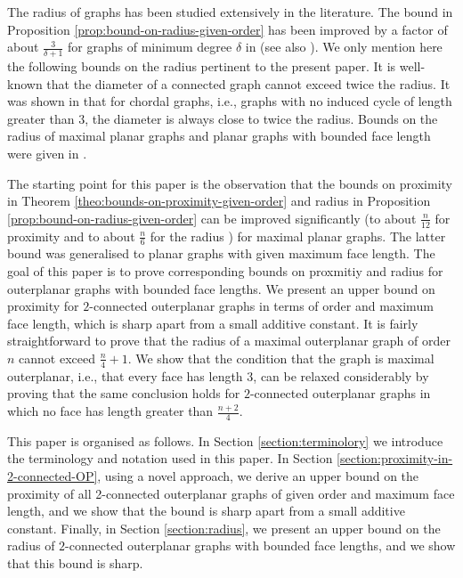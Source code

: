 \documentclass[a4paper,11pt]{article}
\numberwithin{equation}{theorem}
\begin{document}
The radius of graphs has been studied extensively in the literature. The bound in 
Proposition \ref{prop:bound-on-radius-given-order} has been improved by a factor of about
$\frac{3}{\delta+1}$ for graphs of minimum degree $\delta$ in \cite{ErdPacPolTuz1989} 
(see also \cite{KimRhoSonHwa2012, Muk2014}). We only mention here the following bounds on the radius
pertinent to the present paper. It is well-known that the diameter
of a connected graph cannot exceed twice the radius. It was shown in \cite{ChaNem1984} that for 
chordal graphs, i.e., graphs with no induced cycle of length greater than $3$, the diameter is
always close to twice the radius. Bounds on the radius of maximal planar graphs and planar 
graphs with bounded face length were given in \cite{AliDanMuk2012}.


The starting point for this paper is the observation that the bounds on proximity in 
Theorem \ref{theo:bounds-on-proximity-given-order} and radius in 
Proposition \ref{prop:bound-on-radius-given-order} can be improved significantly 
(to about $\frac{n}{12}$ for proximity \cite{CzaDanOlsSze2022} and to about 
$\frac{n}{6}$ for the radius  \cite{AliDanMuk2012}) for maximal planar graphs. 
The latter bound was generalised to planar graphs with given maximum face length. 
The goal of this paper is to prove corresponding bounds on proxmitiy and radius for 
outerplanar graphs with bounded face lengths. We present an upper bound on 
proximity for $2$-connected outerplanar
graphs in terms of order and maximum face length, which is sharp apart from a small additive 
constant. 
It is fairly straightforward to prove that the radius of a maximal outerplanar graph of order
$n$ cannot exceed $\frac{n}{4}+1$. We show that the condition that the graph is maximal outerplanar,
i.e., that every face has length $3$, can be relaxed considerably by  proving that the same
conclusion holds for $2$-connected outerplanar graphs in which no face has length greater
than $\frac{n+2}{4}$.

This paper is organised as follows. 
In Section \ref{section:terminolory} we introduce the terminology and notation used in
this paper. 
In Section \ref{section:proximity-in-2-connected-OP}, using a novel approach, we derive an upper 
bound on the proximity of all 2-connected outerplanar graphs of given order and maximum face 
length, and we show that the bound is sharp apart from a small additive constant. 
Finally, in Section \ref{section:radius}, we present an upper bound on the radius of $2$-connected outerplanar graphs with bounded face lengths, and we show that this bound is sharp.
 
\end{document}
